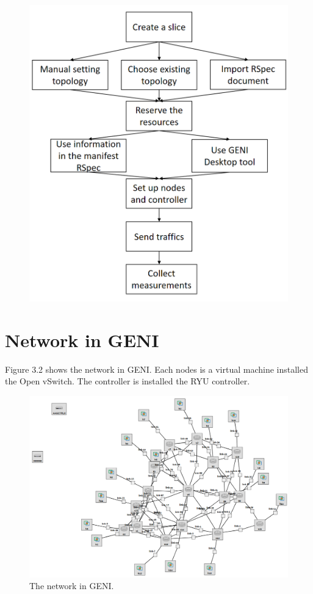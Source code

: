 \documentclass[a4paper,12pt]{report}
\begin{document}
\begin{large}
\begin{figure}
          \includegraphics[width=1.0\textwidth]{geni_workflow.png}
       \end{figure}
    \section{Network in GENI}
      \qquad Figure 3.2 shows the network in GENI. Each nodes is a virtual machine installed the Open vSwitch. The controller is installed the RYU controller.
    \begin{figure}
          \caption{The network in GENI.}
          \centering
          \includegraphics[width=1.0\textwidth]{GENI_network.png}
       \end{figure}

\end{large}
\end{document}
